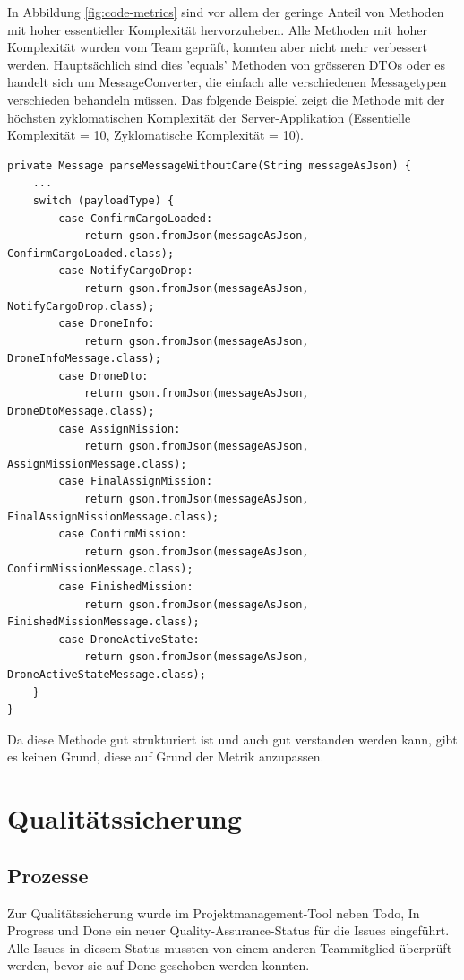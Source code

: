 In Abbildung \ref{fig:code-metrics} sind vor allem der geringe Anteil von Methoden mit hoher essentieller Komplexität\cite[S. 79]{MCCABE} hervorzuheben. Alle Methoden mit hoher Komplexität wurden vom Team geprüft, konnten aber nicht mehr verbessert werden. Hauptsächlich sind dies 'equals' Methoden von grösseren \Gls{DTO}s oder es handelt sich um MessageConverter, die einfach alle verschiedenen Messagetypen verschieden behandeln müssen. Das folgende Beispiel zeigt die Methode mit der höchsten zyklomatischen Komplexität der Server-Applikation (Essentielle Komplexität = 10, Zyklomatische Komplexität = 10). \\


\begin{lstlisting}
private Message parseMessageWithoutCare(String messageAsJson) {
	...
	switch (payloadType) {
		case ConfirmCargoLoaded:
			return gson.fromJson(messageAsJson, ConfirmCargoLoaded.class);
		case NotifyCargoDrop:
			return gson.fromJson(messageAsJson, NotifyCargoDrop.class);
		case DroneInfo:
			return gson.fromJson(messageAsJson, DroneInfoMessage.class);
		case DroneDto:
			return gson.fromJson(messageAsJson, DroneDtoMessage.class);
		case AssignMission:
			return gson.fromJson(messageAsJson, AssignMissionMessage.class);
		case FinalAssignMission:
			return gson.fromJson(messageAsJson, FinalAssignMissionMessage.class);
		case ConfirmMission:
			return gson.fromJson(messageAsJson, ConfirmMissionMessage.class);
		case FinishedMission:
			return gson.fromJson(messageAsJson, FinishedMissionMessage.class);
		case DroneActiveState:
			return gson.fromJson(messageAsJson, DroneActiveStateMessage.class);
	}
}

\end{lstlisting}

Da diese Methode gut strukturiert ist und auch gut verstanden werden kann, gibt es keinen Grund, diese auf Grund der Metrik anzupassen.

\section{Qualitätssicherung}
\label{quality-assurance}

\subsection{Prozesse}

Zur Qualitätssicherung wurde im Projektmanagement-Tool neben Todo, In Progress und Done ein neuer Quality-Assurance-Status für die Issues eingeführt. Alle Issues in diesem Status mussten von einem anderen Teammitglied überprüft werden, bevor sie auf Done geschoben werden konnten. \\

